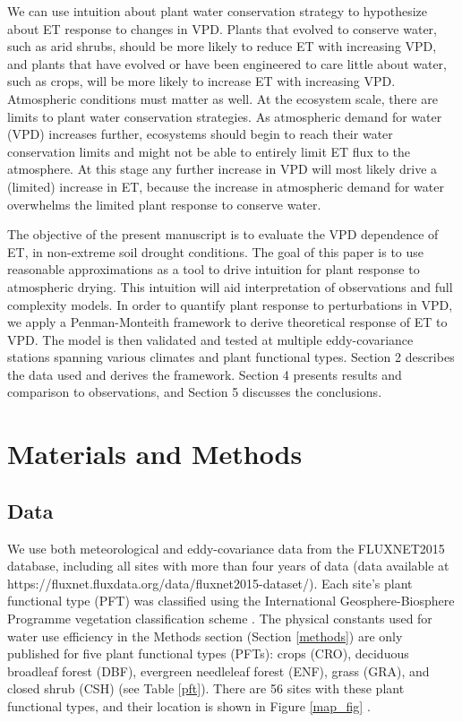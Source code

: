 \documentclass[draft,linenumbers]{gcbjournal}
\begin{document}
We can use intuition about plant water conservation strategy to hypothesize about ET response to changes in VPD. Plants that evolved to conserve water, such as arid shrubs, should be more likely to reduce ET with increasing VPD, and plants that have evolved or have been engineered to care little about water, such as crops, will be more likely to increase ET with increasing VPD. Atmospheric conditions must matter as well. At the ecosystem scale, there are limits to plant water conservation strategies. As atmospheric demand for water (VPD) increases further, ecosystems should begin to reach their water conservation limits and might not be able to entirely limit ET flux to the atmosphere. At this stage any further increase in VPD will most likely drive a (limited) increase in ET, because the increase in atmospheric demand for water overwhelms the limited plant response to conserve water.

The objective of the present manuscript is to evaluate the VPD dependence of ET, in non-extreme soil drought conditions. The goal of this paper is to use reasonable approximations as a tool to drive intuition for plant response to atmospheric drying. This intuition will aid interpretation of observations and full complexity models. In order to quantify plant response to perturbations in VPD, we apply a Penman-Monteith framework to derive theoretical response of ET to VPD. The model is then validated and tested at multiple eddy-covariance stations spanning various climates and plant functional types. Section 2 describes the data used and derives the framework. Section 4 presents results and comparison to observations, and  Section 5 discusses the conclusions. 


\section{Materials and Methods}
\subsection{Data}
\label{data}
We use both meteorological and eddy-covariance data from the FLUXNET2015 database, including all sites with more than four years of data (data available at https://fluxnet.fluxdata.org/data/fluxnet2015-dataset/). Each site's plant functional type (PFT) was classified using the International Geosphere-Biosphere Programme vegetation classification scheme \citep{Loveland_1999}. The physical constants used for water use efficiency in the Methods section (Section \ref{methods}) are only published for five plant functional types (PFTs): crops (CRO), deciduous broadleaf forest (DBF), evergreen needleleaf forest (ENF), grass (GRA), and closed shrub (CSH) (see Table \ref{pft}). There are 56 sites with these plant functional types, and their location is shown in  Figure \ref{map_fig} .
\end{document}
